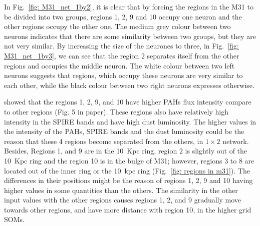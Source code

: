         In Fig.~\ref{fig: M31_net_1by2}, it is clear that by forcing the regions in the M31 to be divided into two groups, regions 1, 2, 9 and 10 occupy one neuron and the other regions occupy the other one.
        The medium grey colour between two neurons indicates that there are some similarity between two groups, but they are not very similar. 
        By increasing the size of the neurones to three, in Fig.~\ref{fig: M31_net_1by3}, we can see that the region 2 separates itself from the other regions and occupies the middle neuron.
        The white colour between two left neurons suggests that regions, which occupy these neurons are very similar to each other, while the black colour between two right neurons expresses otherwise.
        
        \cite{Dim15} showed that the regions 1, 2, 9, and 10 have higher PAHs flux intensity compare to other regions (Fig. 5 in \cite{Dim15} paper). 
        These regions also have relatively high intensity in the SPIRE bands and have high dust luminosity.
        The higher values in the intensity of the PAHs, SPIRE bands and the dust luminosity could be the reason that these 4 regions become separated from the others, in $1\times2$ network.
        Besides, Regions 1, and 9 are in the 10~Kpc ring, region 2 is slightly out of the 10~Kpc ring and the region 10 is in the bulge of M31; however, regions 3 to 8 are located out of the inner ring or the 10~kpc ring (Fig.~\ref{fig: regions in m31}).   
        The differences in their positions might be the reason of regions 1, 2, 9 and 10 having higher values in some quantities than the others. 
        The similarity in the other input values with the other regions causes regions 1, 2, and 9 gradually move towards other regions, and have more distance with region 10, in the higher grid SOMs.
        

